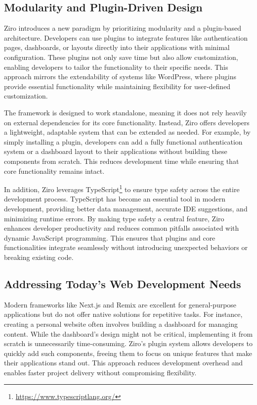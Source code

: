 \subsection{Modularity and Plugin-Driven Design}

Ziro introduces a new paradigm by prioritizing modularity and a plugin-based architecture. Developers can use plugins to integrate features like authentication pages, dashboards, or layouts directly into their applications with minimal configuration. These plugins not only save time but also allow customization, enabling developers to tailor the functionality to their specific needs. This approach mirrors the extendability of systems like WordPress, where plugins provide essential functionality while maintaining flexibility for user-defined customization.

The framework is designed to work standalone, meaning it does not rely heavily on external dependencies for its core functionality. Instead, Ziro offers developers a lightweight, adaptable system that can be extended as needed. For example, by simply installing a plugin, developers can add a fully functional authentication system or a dashboard layout to their applications without building these components from scratch. This reduces development time while ensuring that core functionality remains intact.

In addition, Ziro leverages TypeScript\footnote{\url{https://www.typescriptlang.org/}} to ensure type safety across the entire development process. TypeScript has become an essential tool in modern development, providing better data management, accurate IDE suggestions, and minimizing runtime errors. By making type safety a central feature, Ziro enhances developer productivity and reduces common pitfalls associated with dynamic JavaScript programming. This ensures that plugins and core functionalities integrate seamlessly without introducing unexpected behaviors or breaking existing code.

\subsection{Addressing Today’s Web Development Needs}

Modern frameworks like Next.js and Remix are excellent for general-purpose applications but do not offer native solutions for repetitive tasks. For instance, creating a personal website often involves building a dashboard for managing content. While the dashboard’s design might not be critical, implementing it from scratch is unnecessarily time-consuming. Ziro’s plugin system allows developers to quickly add such components, freeing them to focus on unique features that make their applications stand out. This approach reduces development overhead and enables faster project delivery without compromising flexibility.

